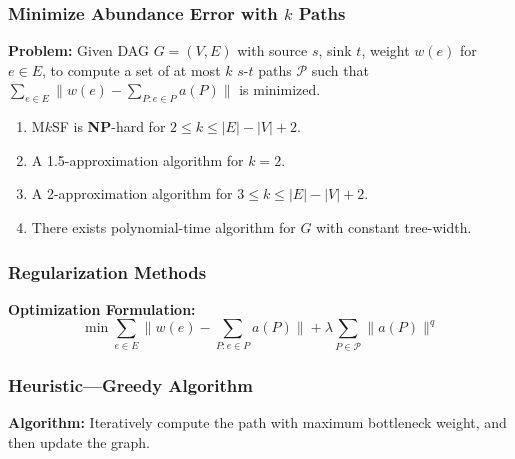 \frame
{
	\frametitle{Minimize Abundance Error with $k$ Paths}
	{\bf Problem:} Given DAG $G=(V,E)$ with source $s$, sink $t$, weight $w(e)$ for $e\in E$,
		to compute a set of at most $k$ $s$-$t$ paths $\mathcal{P}$ such that
			$\sum_{e\in E} \| w(e) - \sum_{P:e\in P} a(P)\|$ is minimized.

	\vspace{0.3cm}

	\vspace{0.2cm}
	\begin{enumerate}
	\item<3-> {M$k$SF is {\bf NP}-hard for $2\le k \le |E| - |V| + 2$.}
	\vspace{0.1cm}
	\item<4-> A 1.5-approximation algorithm for $k=2$.
	\vspace{0.1cm}
	\item<5-> A 2-approximation algorithm for $3\le k \le |E| - |V| + 2$.
	\vspace{0.1cm}
	\item<6-> There exists polynomial-time algorithm for $G$ with constant tree-width.
	\end{enumerate}
}

\frame
{
	\frametitle{Regularization Methods}

	{\bf Optimization Formulation:}
	\begin{displaymath}
	\min  \sum_{e\in E} \|w(e) - \sum_{P:e\in P} a(P)\| + \lambda \sum_{P\in\mathcal{P}} \|a(P)\|^q
	\end{displaymath}

	\vspace{0.2cm}

	\vspace{0.2cm}
}

\frame
{
	\frametitle{Heuristic---Greedy Algorithm}

	{\bf Algorithm:} Iteratively compute the path with maximum bottleneck weight, and then update the graph.
	\vspace{0.7cm}
	
	\vspace{3.5cm}
}
